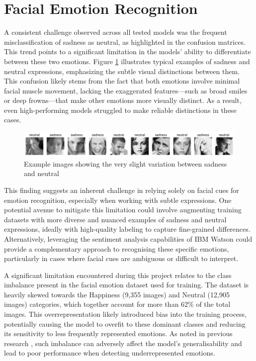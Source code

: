 \section{Facial Emotion Recognition}

A consistent challenge observed across all tested models was the frequent misclassification of sadness as neutral, as highlighted in the confusion matrices. This trend points to a significant limitation in the models' ability to differentiate between these two emotions. Figure \ref{figure:sadneutral} illustrates typical examples of sadness and neutral expressions, emphasizing the subtle visual distinctions between them. This confusion likely stems from the fact that both emotions involve minimal facial muscle movement, lacking the exaggerated features—such as broad smiles or deep frowns—that make other emotions more visually distinct. As a result, even high-performing models struggled to make reliable distinctions in these cases.

\begin{figure}[H]
    \centering{}
    \includegraphics[scale=0.38]{fed_images/sadness+neutral.png}
    \caption{Example images showing the very slight variation between sadness and neutral}
    \label{figure:sadneutral}
\end{figure}

This finding suggests an inherent challenge in relying solely on facial cues for emotion recognition, especially when working with subtle expressions. One potential avenue to mitigate this limitation could involve augmenting training datasets with more diverse and nuanced examples of sadness and neutral expressions, ideally with high-quality labeling to capture fine-grained differences. Alternatively, leveraging the sentiment analysis capabilities of IBM Watson could provide a complementary approach to recognising these specific emotions, particularly in cases where facial cues are ambiguous or difficult to interpret.

A significant limitation encountered during this project relates to the class imbalance present in the facial emotion dataset used for training. The dataset is heavily skewed towards the Happiness (9,355 images) and Neutral (12,905 images) categories, which together account for more than 62\% of the total images. This overrepresentation likely introduced bias into the training process, potentially causing the model to overfit to these dominant classes and reducing its sensitivity to less frequently represented emotions. As noted in previous research \cite{Rangulov2020-pd}, such imbalance can adversely affect the model's generalisability and lead to poor performance when detecting underrepresented emotions.

